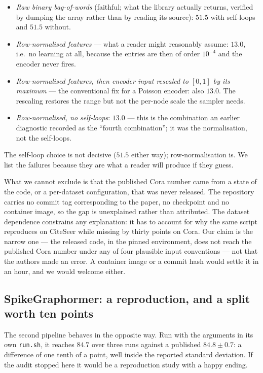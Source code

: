 \documentclass[10pt,twocolumn]{article}
\begin{document}
\begin{itemize}\itemsep2pt
\item \emph{Raw binary bag-of-words} (faithful; what the library actually returns, verified by
dumping the array rather than by reading its source): $51.5$ with self-loops and $51.5$ without.
\item \emph{Row-normalised features} --- what a reader might reasonably assume: $13.0$, i.e.\ no
learning at all, because the entries are then of order $10^{-4}$ and the encoder never fires.
\item \emph{Row-normalised features, then encoder input rescaled to $[0,1]$ by its maximum} --- the
conventional fix for a Poisson encoder: also $13.0$. The rescaling restores the range but not the
per-node scale the sampler needs.
\item \emph{Row-normalised, no self-loops}: $13.0$ --- this is the combination an earlier
diagnostic recorded as the ``fourth combination''; it was the normalisation, not the self-loops.
\end{itemize}

The self-loop choice is not decisive ($51.5$ either way); row-normalisation is. We list the
failures because they are what a reader will produce if they guess.

What we cannot exclude is that the published Cora number came from a state of the code, or a
per-dataset configuration, that was never released. The repository carries no commit tag
corresponding to the paper, no checkpoint and no container image, so the gap is unexplained rather
than attributed. The dataset dependence constrains any explanation: it has to account for why the
same script reproduces on CiteSeer while missing by thirty points on Cora. Our claim is the narrow
one --- the released code, in the pinned environment, does not reach the published Cora number under
any of four plausible input conventions --- not that the authors made an error. A container image or
a commit hash would settle it in an hour, and we would welcome either.

\subsection{SpikeGraphormer: a reproduction, and a split worth ten points}
\label{sec:split}


The second pipeline behaves in the opposite way. Run with the arguments in its own \texttt{run.sh}, it
reaches $84.7$ over three runs against a published $84.8\pm0.7$: a difference of one tenth of a
point, well inside the reported standard deviation. If the audit stopped here it would be a
reproduction study with a happy ending.
\end{document}
